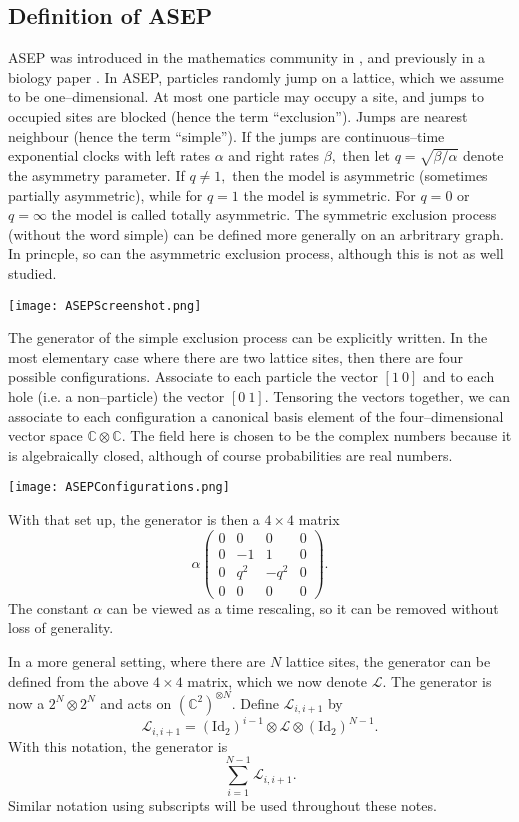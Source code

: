 \documentclass{ximera}
\begin{document}
\subsection{Definition of ASEP}
ASEP was introduced in the mathematics community in \cite{Spi70}, 
and previously in a biology paper \cite{MGP68}. In ASEP, particles randomly jump on a lattice, which we assume to be
one--dimensional. At most one particle may occupy a site, and jumps to occupied sites are blocked (hence the term ``exclusion'').
Jumps are nearest neighbour (hence the term ``simple''). If the jumps are continuous--time exponential 
clocks with left rates $\alpha$ and right rates $\beta,$ then let $q=\sqrt{\beta/\alpha}$ denote the 
asymmetry parameter. If $q\neq 1,$ then the model is asymmetric (sometimes partially asymmetric), 
while for $q=1$ the model is symmetric. For $q=0$ or $q=\infty$ the model is called totally asymmetric.
The symmetric exclusion process (without the word simple) can be defined more generally on an arbritrary graph. In princple, so can 
the asymmetric exclusion process, although this is not as well studied.  

\texttt{[image: ASEPScreenshot.png]}

The generator of the simple exclusion process can be explicitly written. In the most elementary case 
where there are two lattice sites, then there are four possible configurations. Associate to each
particle the vector $[1\ 0]$ and to each hole (i.e. a non--particle) the vector $[0 \ 1].$ Tensoring
the vectors together, we can associate to each configuration a canonical basis element of the four--dimensional
vector space $\mathbb{C}\otimes \mathbb{C}.$ The field here is chosen to be the complex numbers because
it is algebraically closed, although of course probabilities are real numbers. 

\texttt{[image: ASEPConfigurations.png]}

With that set up, the generator is then a $4\times 4$ matrix
$$
\alpha\left(
    \begin{array}{cccc}
       0 & 0 & 0 & 0 \\
       0 & -1 & 1 & 0 \\
       0 & q^2 & -q^2 & 0 \\
       0 & 0 & 0 & 0 
    \end{array}
\right).
$$
The constant $\alpha$ can be viewed as a time rescaling, so it can be removed without loss of generality. 

In a more general setting, where there are $N$ lattice sites, the generator can be defined from the
above \(4\times 4\) matrix, which we now denote \(\mathcal{L}.\) The generator is now a \(2^N \otimes 2^N\) and
acts on  \((\mathbb{C}^2)^{\otimes N}.\) Define \(\mathcal{L}_{i,i+1}\) by 
\[
\mathcal{L}_{i,i+1} = (\mathrm{Id}_2)^{i-1} \otimes \mathcal{L} \otimes (\mathrm{Id}_2)^{N-1}.
\]
With this notation, the generator is
\[
\sum_{i=1}^{N-1} \mathcal{L}_{i,i+1}.
\]
Similar notation using subscripts will be used throughout these notes.
\end{document}
